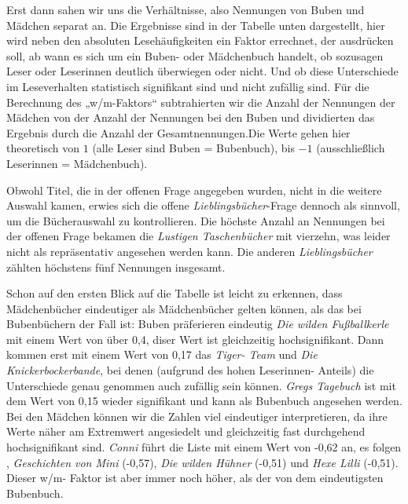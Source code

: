 Erst dann sahen wir uns die Verhältnisse, also Nennungen von Buben und
Mädchen separat an. Die Ergebnisse sind in der Tabelle unten
dargestellt, hier wird neben den absoluten Lesehäufigkeiten ein Faktor
errechnet, der ausdrücken soll, ab wann es sich um ein Buben- oder
Mädchenbuch handelt, ob sozusagen Leser oder Leserinnen deutlich
überwiegen oder nicht. Und ob diese Unterschiede im Leseverhalten
statistisch signifikant sind und nicht zufällig sind. Für die Berechnung
des „w/m-Faktors`` subtrahierten wir die Anzahl der Nennungen der
Mädchen von der Anzahl der Nennungen bei den Buben und dividierten das
Ergebnis durch die Anzahl der Gesamtnennungen.Die Werte gehen hier
theoretisch von $1$ (alle Leser sind Buben = Bubenbuch), bis $-1$
(ausschließlich Leserinnen = Mädchenbuch).



Obwohl Titel, die in der offenen Frage angegeben wurden, nicht in die
weitere Auswahl kamen, erwies sich die offene
\emph{Lieblingsbücher}-Frage dennoch als sinnvoll, um die Bücherauswahl
zu kontrollieren. Die höchste Anzahl an Nennungen bei der offenen Frage
bekamen die \emph{Lustigen Taschenbücher} mit vierzehn, was leider nicht
als repräsentativ angesehen werden kann. Die anderen
\emph{Lieblingsbücher} zählten höchstens fünf Nennungen insgesamt.

Schon auf den ersten Blick auf die Tabelle ist leicht zu erkennen, dass
Mädchenbücher eindeutiger als Mädchenbücher gelten können, als das bei
Bubenbüchern der Fall ist: Buben präferieren eindeutig \emph{Die wilden
Fußballkerle} mit einem Wert von über 0,4, diser Wert ist gleichzeitig
hochsignifikant. Dann kommen erst mit einem Wert von 0,17 das
\emph{Tiger- Team} und \emph{Die Knickerbockerbande}, bei denen
(aufgrund des hohen Leserinnen- Anteils) die Unterschiede genau genommen
auch zufällig sein können. \emph{Gregs Tagebuch} ist mit dem Wert von
0,15 wieder signifikant und kann als Bubenbuch angesehen werden. Bei den
Mädchen können wir die Zahlen viel eindeutiger interpretieren, da ihre
Werte näher am Extremwert angesiedelt und gleichzeitig fast durchgehend
hochsignifikant sind. \emph{Conni} führt die Liste mit einem Wert von
-0,62 an, es folgen , \emph{Geschichten von Mini} (-0,57), \emph{Die
wilden Hühner} (-0,51) und \emph{Hexe Lilli} (-0,51). Dieser w/m- Faktor
ist aber immer noch höher, als der von dem eindeutigsten Bubenbuch.


